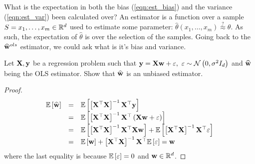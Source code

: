 What is the expectation in both the bias (\ref{eqn:est_bias}) and the variance (\ref{eqn:est_var}) been calculated over? An estimator is a function over a sample $S=x_1,\ldots,x_m\in\mathbb{R}^d$ used to estimate some parameter: $\widehat{\theta}\left(x_1,\ldots,x_m\right)\overset{?}{\approx}\theta$. As such, the expectation of $\widehat{\theta}$ is over the selection of the samples. Going back to the $\widehat{\mathbf{w}}^{ols}$ estimator, we could ask what is it's bias and variance.

\begin{exercise}
Let $\mathbf{X},\mathbf{y}$ be a regression problem such that $\mathbf{y}=\mathbf{X}\mathbf{w}+\varepsilon,\,\,\varepsilon\sim\mathcal{N}\left(0,\sigma^2I_d\right)$ and $\widehat{\mathbf{w}}$ being the OLS estimator. Show that $\widehat{\mathbf{w}}$ is an unbiased estimator.
\end{exercise}
\begin{proof}
$$
\begin{array}{ccl}
\mathbb{E}\left[\widehat{\mathbf{w}}\right] & = &\mathbb{E}\left[\left[\mathbf{X}^\top\mathbf{X}\right]^{-1}\mathbf{X}^\top\mathbf{y}\right] \\
& = & \mathbb{E}\left[\left[\mathbf{X}^\top\mathbf{X}\right]^{-1}\mathbf{X}^\top\left(\mathbf{X}\mathbf{w} +\varepsilon\right)\right] \\
& = & \mathbb{E}\left[\left[\mathbf{X}^\top\mathbf{X}\right]^{-1}\mathbf{X}^\top\mathbf{X}\mathbf{w}\right] + \mathbb{E}\left[\left[\mathbf{X}^\top\mathbf{X}\right]^{-1}\mathbf{X}^\top\varepsilon\right]\\
& = & \mathbb{E}\left[\mathbf{w}\right] + \left[\mathbf{X}^\top\mathbf{X}\right]^{-1}\mathbf{X}^\top\mathbb{E}\left[\varepsilon\right] = \mathbf{w}\\
\end{array}
$$
where the last equality is because $\mathbb{E}\left[\varepsilon\right]=0$ and $\mathbf{w}\in\mathbb{R}^d$.
\end{proof}
~\\

